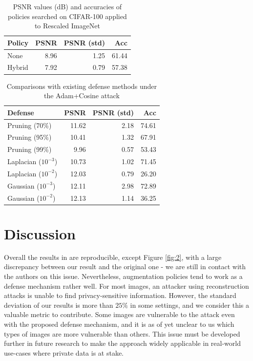\begin{table}[htb]
    \centering
    \begin{tabular}{lrrr}
        \hline
         Policy   &   PSNR &   PSNR (std) &   Acc \\
        \hline
         None     &        8.96 &       1.25 & 61.44 \\
         Hybrid   &        7.92 &       0.79 & 57.38 \\
        \hline
    \end{tabular}
    \caption{PSNR values (dB) and accuracies of policies searched on CIFAR-100 applied to Rescaled ImageNet}
    \label{tab:ext1}
\end{table}
\begin{table}[htb]
    \centering
        \begin{tabular}{lrrr}
        \hline
         Defense               &   PSNR &   PSNR (std) &   Acc \\
        \hline
         Pruning (70\%)         &       11.62 &       2.18 & 74.61 \\
         Pruning (95\%)         &       10.41 &       1.32 & 67.91 \\
         Pruning (99\%)         &        9.96 &       0.57 & 53.43 \\
         Laplacian ($10^{-3}$) &       10.73 &       1.02 & 71.45 \\
         Laplacian ($10^{-2}$) &       12.03 &       0.79 & 26.20 \\
         Gaussian ($10^{-3}$)  &       12.11 &       2.98 & 72.89 \\
         Gaussian ($10^{-2}$)  &       12.13 &       1.14 & 36.25 \\
        \hline
    \end{tabular}
    \caption{Comparisons with existing defense methods under the Adam+Cosine attack}
    \label{tab:3}
    \vspace{-8mm}
\end{table}

\section{Discussion}
\label{sec:discussion}

Overall the results in \cite{gao2021privacy} are reproducible, except Figure \ref{fig:2}, with a large discrepancy between our result and the original one -  we are still in contact with the authors on this issue. Nevertheless, augmentation policies tend to work as a defense mechanism rather well. For most images, an attacker using reconstruction attacks is unable to find privacy-sensitive information. However, the standard deviation of our results is more than $25\%$ in some settings, and we consider this a valuable metric to contribute. Some images are vulnerable to the attack even with the proposed defense mechanism, and it is as of yet unclear to us which types of images are more vulnerable than others. This issue must be developed further in future research to make the approach widely applicable in real-world use-cases where private data is at stake.

